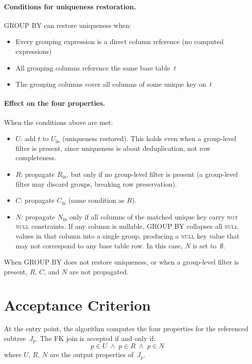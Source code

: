 \documentclass[11pt]{article}
\theoremstyle{definition}
\newcommand{\Jp}{J_p}
\begin{document}
\paragraph{Conditions for uniqueness restoration.}
GROUP BY can restore uniqueness when:
\begin{itemize}[nosep]
\item Every grouping expression is a direct column reference (no
  computed expressions)
\item All grouping columns reference the same base table~$t$
\item The grouping columns cover all columns of some unique key on~$t$
\end{itemize}

\paragraph{Effect on the four properties.}
When the conditions above are met:
\begin{itemize}
\item $U$: add $t$ to $U_{\mathrm{in}}$ (uniqueness restored).  This
  holds even when a group-level filter is present, since uniqueness is
  about deduplication, not row completeness.
\item $R$: propagate $R_{\mathrm{in}}$, but only if no group-level
  filter is present (a group-level filter may discard groups, breaking
  row preservation).
\item $C$: propagate $C_{\mathrm{in}}$ (same condition as $R$).
\item $N$: propagate $N_{\mathrm{in}}$ only if all columns of the
  matched unique key carry \textsc{not null} constraints.  If any
  column is nullable, GROUP BY collapses all \textsc{null} values in
  that column into a single group, producing a \textsc{null} key value
  that may not correspond to any base table row.  In this case, $N$ is
  set to~$\emptyset$.
\end{itemize}

When GROUP BY does not restore uniqueness, or when a group-level
filter is present, $R$, $C$, and $N$ are not propagated.


\section{Acceptance Criterion}

At the entry point, the algorithm computes the four properties for the
referenced subtree~$\Jp$.  The FK join is accepted if and only if:
\[
  p \in U \;\land\; p \in R \;\land\; p \in N
\]
where $U$, $R$, $N$ are the output properties of~$\Jp$.
\end{document}
